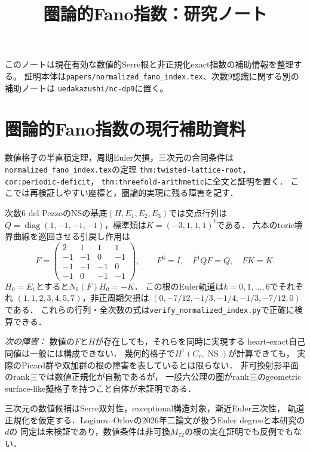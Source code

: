 \documentclass[11pt,a4paper]{ltjsarticle}
\title{圏論的Fano指数：研究ノート}
\author{}
\date{\versiondate}
\begin{document}
\maketitle
このノートは現在有効な数値的Serre根と非正規化exact指数の補助情報を整理する。
証明本体は\texttt{papers/normalized\_fano\_index.tex}、次数9認識に関する別の補助ノートは
\texttt{uedakazushi/nc-dp9}に置く。
\tableofcontents

\section{圏論的Fano指数の現行補助資料}
数値格子の半直積定理，周期Euler欠損，三次元の合同条件は
\texttt{normalized\_fano\_index.tex}の定理
\texttt{thm:twisted-lattice-root}，\texttt{cor:periodic-deficit}，
\texttt{thm:threefold-arithmetic}に全文と証明を置く．
ここでは再検証しやすい座標と，圏論的実現に残る障害を記す．

次数6 del PezzoのNSの基底$(H,E_1,E_2,E_3)$では交点行列は
$Q=\operatorname{diag}(1,-1,-1,-1)$，標準類は$K=(-3,1,1,1)^t$である．
六本のtoric境界曲線を巡回させる引戻し作用は
\[
 F=\begin{pmatrix}
 2&1&1&1\\-1&-1&0&-1\\-1&-1&-1&0\\-1&0&-1&-1
 \end{pmatrix},\qquad
 F^6=I,\quad F^tQF=Q,\quad FK=K.
\]
$H_0=E_1$とすると$N_6(F)H_0=-K$．
この根のEuler軌道は$k=0,1,\ldots,6$でそれぞれ
$(1,1,2,3,4,5,7)$，非正周期欠損は
$(0,-7/12,-1/3,-1/4,-1/3,-7/12,0)$である．
これらの行列・全次数の式は\texttt{verify\_normalized\_index.py}で正確に検算できる．

\emph{次の障害：} 数値の$F$と$H$が存在しても，それらを同時に実現する
heart-exact自己同値は一般には構成できない．
幾何的格子で$H^1(C_r,\operatorname{NS})$が計算できても，
実際のPicard群や双加群の根の障害を表しているとは限らない．
非可換射影平面のrank三では数値正規化が自動であるが，
一般六公理の圏がrank三のgeometric surface-like擬格子を持つこと自体が未証明である．

三次元の数値候補はSerre双対性，exceptional構造対象，漸近Euler三次性，
軌道正規化を仮定する．Loginov--Orlovの2026年二論文が扱うEuler degreeと本研究の$d$の
同定は未検証であり，数値条件は非可換$M_{72}$の根の実在証明でも反例でもない．
\end{document}
